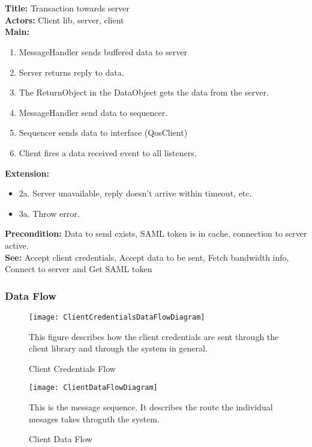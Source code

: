 		\\\\
		\textbf{Title:} Transaction towards server \\
		\textbf{Actors:} Client lib, server, client \\
		\textbf{Main:}
		\begin{enumerate}
			\item MessageHandler sends buffered data to server
			\item Server returns reply to data.
			\item The ReturnObject in the DataObject gets the data from the server.
			\item MessageHandler send data to sequencer.
			\item Sequencer sends data to interface (QosClient)
			\item Client fires a data received event to all listeners.
		\end{enumerate}
		\textbf{Extension:}
		\begin{itemize}
			 \item[] 2a. Server unavailable, reply doesn’t arrive within timeout, etc.
			 \item[] 3a. Throw error.
		\end{itemize}
		\textbf{Precondition:} Data to send exists, SAML token is in cache, connection to server active.\\
		\textbf{See:} Accept client credentials, Accept data to be sent, Fetch bandwidth info, Connect to server and Get SAML token
		
	\subsubsection{Data Flow}\label{textual client data flow}
        
    \begin{figure}[h]
        \centering
        \texttt{[image: ClientCredentialsDataFlowDiagram]}
        \caption{Client Credentials Flow}
        This figure describes how the client credentials are sent through the client library and through the system in general. 
        \label{fig:ClientCredentialsDataFlowDiagram}
    \end{figure}
    
    \begin{figure}[h]
        \centering
        \texttt{[image: ClientDataFlowDiagram]}
        \caption{Client Data Flow}
        This is the message sequence. It describes the route the individual mesages takes throguth the system. 
        \label{fig:ClientDataFlowDiagram}
    \end{figure}
    
